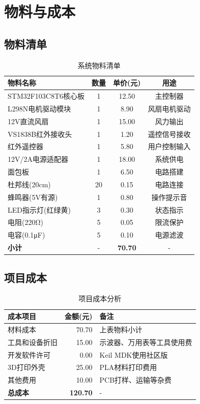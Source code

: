 \section{物料与成本}

\subsection{物料清单}
\begin{table}[h]
    \centering
    \caption{系统物料清单}
    \begin{tabular}{|l|c|c|c|}
        \hline
        \textbf{物料名称} & \textbf{数量} & \textbf{单价(元)} & \textbf{用途} \\ \hline
        STM32F103C8T6核心板 & 1 & 12.50 & 主控制器 \\ \hline
        L298N电机驱动模块 & 1 & 8.90 & 风扇电机驱动 \\ \hline
        12V直流风扇 & 1 & 15.00 & 风力输出 \\ \hline
        VS1838B红外接收头 & 1 & 1.20 & 遥控信号接收 \\ \hline
        红外遥控器 & 1 & 5.80 & 用户控制输入 \\ \hline
        12V/2A电源适配器 & 1 & 18.00 & 系统供电 \\ \hline
        面包板 & 1 & 6.50 & 电路搭建 \\ \hline
        杜邦线(20cm) & 20 & 0.15 & 电路连接 \\ \hline
        蜂鸣器(5V有源) & 1 & 0.80 & 操作提示音 \\ \hline
        LED指示灯(红绿黄) & 3 & 0.30 & 状态指示 \\ \hline
        电阻(220Ω) & 5 & 0.05 & 限流保护 \\ \hline
        电容(0.1μF) & 5 & 0.10 & 电源滤波 \\ \hline
        \textbf{小计} & - & \textbf{70.70} & - \\ \hline
    \end{tabular}
\end{table}

\subsection{项目成本}
\begin{table}[h]
    \centering
    \caption{项目成本分析}
    \begin{tabular}{|l|r|l|}
        \hline
        \textbf{成本项目} & \textbf{金额(元)} & \textbf{备注} \\ \hline
        材料成本 & 70.70 & 上表物料小计 \\ \hline
        工具和设备折旧 & 15.00 & 示波器、万用表等工具使用费 \\ \hline
        开发软件许可 & 0.00 & Keil MDK使用社区版 \\ \hline
        3D打印外壳 & 25.00 & PLA材料打印费用 \\ \hline
        其他费用 & 10.00 & PCB打样、运输等杂费 \\ \hline
        \textbf{总成本} & \textbf{120.70} & - \\ \hline
    \end{tabular}
\end{table}

